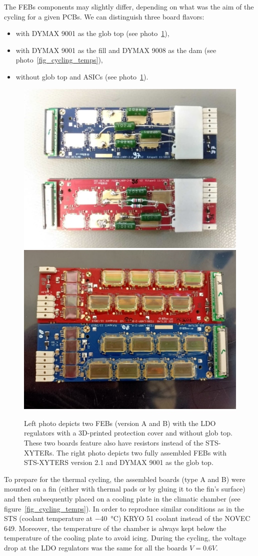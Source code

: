 The \gls{FEB}s components may slightly differ, depending on what was the aim of the cycling for a given \glspl{PCB}. We can distinguish three board flavors:
\begin{itemize}
    \item with DYMAX 9001 as the glob top (see photo~\ref{fig_noglobtop}),
    \item with DYMAX 9001 as the fill and DYMAX 9008 as the dam (see photo~\ref{fig_cycling_temps}), 
    \item without glob top and \glspl{ASIC} (see photo~\ref{fig_noglobtop}).
    \end{itemize}
\newpage
\begin{figure}[!h]
\centering
\includegraphics[width=0.45\columnwidth]{Chapter4/images/noglobtop.jpg}
\includegraphics[width=0.45\columnwidth]{Chapter4/images/globtop.jpg}
\caption{Left photo depicts two \glspl{FEB} (version A and B) with the \gls{LDO} regulators with a 3D-printed protection cover and without glob top. These two boards feature also have resistors instead of the \gls{STS}-XYTERs.
The right photo depicts two fully assembled \gls{FEB}s with \gls{STS}-XYTERS version 2.1 and DYMAX 9001 as the glob top.}
\label{fig_noglobtop}
\end{figure}

To prepare for the thermal cycling, the assembled boards (type A and B) were mounted on a fin (either with thermal pads or by gluing it to the fin's surface) and then subsequently placed on a cooling plate in the climatic chamber (see figure~\ref{fig_cycling_temps}). In order to reproduce similar conditions as in the \gls{STS} (coolant temperature at \SI{-40}{\celsius}) KRYO 51 coolant instead of the NOVEC 649. Moreover, the temperature of the chamber is always kept below the temperature of the cooling plate to avoid icing. During the cycling, the voltage drop at the \gls{LDO} regulators was the same for all the boards $V=0.6V$. 

